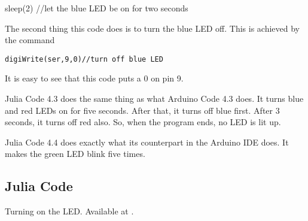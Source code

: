 sleep(2)  //let the blue LED be on for two seconds

The second thing this code does is to turn the blue LED off. This is achieved
by the command

\begin{lstlisting}[style=nonumbers]
     digiWrite(ser,9,0)//turn off blue LED
  \end{lstlisting}

It is easy to see that this code puts a 0 on pin 9.

Julia Code 4.3 does the same thing as what Arduino Code 4.3 does. It turns
blue and red LEDs on for five seconds. After that, it turns off blue first. After
3 seconds, it turns off red also. So, when the program ends, no LED is lit up.

Julia Code 4.4 does exactly what its counterpart in the Arduino IDE does.
It makes the green LED blink five times. 

\subsection{Julia Code}
\lstset{style=mystyle}
\label{sec:led-julia-code}

\begin{juliacode}
  {Turning on the LED.  Available at
    .}
  \label{julia:led-blue}
  
\end{juliacode}

\begin{juliacode}
  \label{julia:led-blue-delay}
  
\end{juliacode}

\begin{juliacode}
  \label{juila:led-bmoe-red}
  
\end{juliacode}

\begin{juliacode}
  \label{julia:lemogreen-blink}
  
\end{juliacode}

